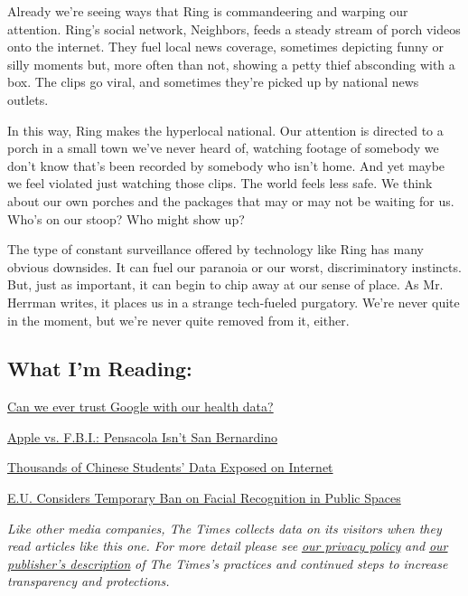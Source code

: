 Already we're seeing ways that Ring is commandeering and warping our
attention. Ring's social network, Neighbors, feeds a steady stream of
porch videos onto the internet. They fuel local news coverage, sometimes
depicting funny or silly moments but, more often than not, showing a
petty thief absconding with a box. The clips go viral, and sometimes
they're picked up by national news outlets.

In this way, Ring makes the hyperlocal national. Our attention is
directed to a porch in a small town we've never heard of, watching
footage of somebody we don't know that's been recorded by somebody who
isn't home. And yet maybe we feel violated just watching those clips.
The world feels less safe. We think about our own porches and the
packages that may or may not be waiting for us. Who's on our stoop? Who
might show up?

The type of constant surveillance offered by technology like Ring has
many obvious downsides. It can fuel our paranoia or our worst,
discriminatory instincts. But, just as important, it can begin to chip
away at our sense of place. As Mr. Herrman writes, it places us in a
strange tech-fueled purgatory. We're never quite in the moment, but
we're never quite removed from it, either.

\hypertarget{what-im-reading}{%
\subsection{What I'm Reading:}\label{what-im-reading}}

\href{https://www.ft.com/content/4ade8884-1b40-11ea-97df-cc63de1d73f4}{Can
we ever trust Google with our health data?}

\href{https://www.lawfareblog.com/apple-vs-fbi-pensacola-isnt-san-bernardino}{Apple
vs. F.B.I.: Pensacola Isn't San Bernardino}

\href{https://www.wsj.com/articles/thousands-of-chinese-students-data-exposed-on-internet-11579283410?mod=e2tw}{Thousands
of Chinese Students' Data Exposed on Internet}

\href{https://www.politico.eu/pro/eu-considers-temporary-ban-on-facial-recognition-in-public-spaces/}{E.U.
Considers Temporary Ban on Facial Recognition in Public Spaces}

\emph{Like other media companies, The Times collects data on its
visitors when they read articles like this one. For more detail please
see}
\href{https://help.nytimes.com/hc/en-us/articles/115014892108-Privacy-policy?module=inline}{\emph{our
privacy policy}} \emph{and}
\href{https://www.nytimes.com/2019/04/10/opinion/sulzberger-new-york-times-privacy.html?rref=collection\%2Fspotlightcollection\%2Fprivacy-project-does-privacy-matter\&action=click\&contentCollection=opinion\&region=stream\&module=stream_unit\&version=latest\&contentPlacement=8\&pgtype=collection}{\emph{our
publisher's description}} \emph{of The Times's practices and continued
steps to increase transparency and protections.}


